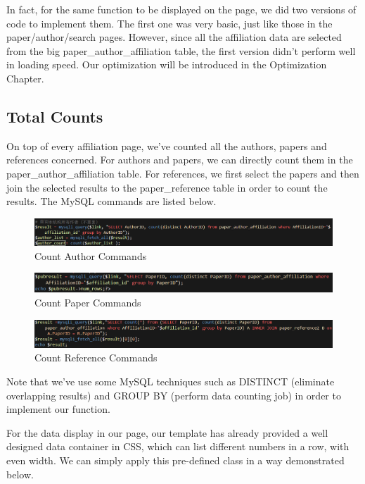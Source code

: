 \documentclass{book}
\begin{document}
In fact, for the same function to be displayed on the page, we did two versions of code to implement them. The first one was very basic, just like those in the paper/author/search pages. However, since all the affiliation data are selected from the big paper\_author\_affiliation table, the first version didn't perform well in loading speed. Our optimization will be introduced in the Optimization Chapter.



\subsection {Total Counts}
On top of every affiliation page, we've counted all the authors, papers and references concerned. For authors and papers, we can directly count them in the paper\_author\_affiliation table. For references, we first select the papers and then join the selected results to the paper\_reference table in order to count the results. The MySQL commands are listed below.

\begin{figure}[H]
\centering
\includegraphics[scale=0.55]{img/zlt_aff_authorcount.png}
\caption{Count Author Commands}
\label{fig:aff_authorcount}
\end{figure}
\begin{figure}[H]
\centering
\includegraphics[scale=0.6]{img/zlt_aff_papercount.png}
\caption{Count Paper Commands}
\label{fig:aff_papercount}
\end{figure}
\begin{figure}[H]
\centering
\includegraphics[scale=0.55]{img/zlt_aff_refcount.png}
\caption{Count Reference Commands}
\label{fig:aff_refcount}
\end{figure}

Note that we've use some MySQL techniques such as DISTINCT (eliminate overlapping results) and GROUP BY (perform data counting job) in order to implement our function.

For the data display in our page, our template has already provided a well designed data container in CSS, which can list different numbers in a row, with even width. We can simply apply this pre-defined class in a way demonstrated below.
\end{document}
